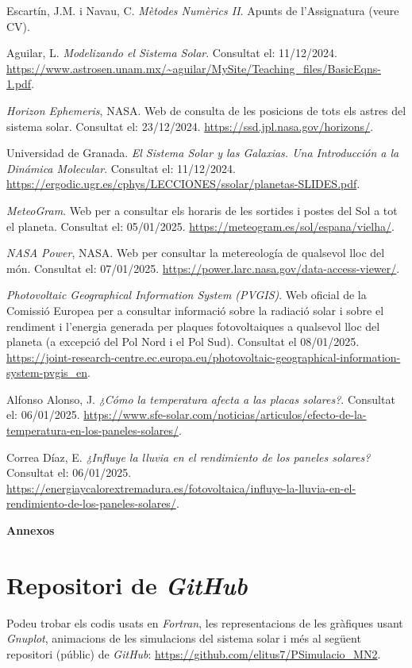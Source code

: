 \documentclass[10pt, twoside, a4paper]{article}
\begin{document}
\newpage
\begin{thebibliography}{99}
    Escartín, J.M. i Navau, C. \textit{Mètodes Numèrics II}. Apunts de l'Assignatura (veure CV).

    Aguilar, L. \textit{Modelizando el Sistema Solar}. Consultat el: 11/12/2024. \url{https://www.astrosen.unam.mx/~aguilar/MySite/Teaching_files/BasicEqns-1.pdf}.

    \textit{Horizon Ephemeris}, NASA. Web de consulta de les posicions de tots els astres del sistema solar. Consultat el: 23/12/2024. \url{https://ssd.jpl.nasa.gov/horizons/}.

    Universidad de Granada. \textit{El Sistema Solar y las Galaxias. Una Introducción a la Dinámica Molecular}. Consultat el: 11/12/2024. \url{https://ergodic.ugr.es/cphys/LECCIONES/ssolar/planetas-SLIDES.pdf}.

    \textit{MeteoGram}. Web per a consultar els horaris de les sortides i postes del Sol a tot el planeta. Consultat el: 05/01/2025. \url{https://meteogram.es/sol/espana/vielha/}.

    \textit{NASA Power}, NASA. Web per consultar la metereología de qualsevol lloc del món. Consultat el: 07/01/2025. \url{https://power.larc.nasa.gov/data-access-viewer/}.

    \textit{Photovoltaic Geographical Information System (PVGIS)}. Web oficial de la Comissió Europea per a consultar informació sobre la radiació solar i sobre el rendiment i l'energia generada per plaques fotovoltaiques a qualsevol lloc del planeta (a excepció del Pol Nord i el Pol Sud). Consultat el 08/01/2025. \url{https://joint-research-centre.ec.europa.eu/photovoltaic-geographical-information-system-pvgis_en}.

    Alfonso Alonso, J. \textit{¿Cómo la temperatura afecta a las placas solares?}. Consultat el: 06/01/2025. \url{https://www.sfe-solar.com/noticias/articulos/efecto-de-la-temperatura-en-los-paneles-solares/}.

    Correa Díaz, E. \textit{¿Influye la lluvia en el rendimiento de los paneles solares?} Consultat el: 06/01/2025. \url{https://energiaycalorextremadura.es/fotovoltaica/influye-la-lluvia-en-el-rendimiento-de-los-paneles-solares/}.
\end{thebibliography}

\newpage
\appendix
{\Huge{\textbf{Annexos}}}
\section{Repositori de \textit{GitHub}}
\label{an:a}
Podeu trobar els codis usats en \textit{Fortran}, les representacions de les gràfiques usant \textit{Gnuplot}, animacions de les simulacions del sistema solar i més al següent repositori (públic) de \textit{GitHub}: \url{https://github.com/elitus7/PSimulacio_MN2}.
\end{document}
